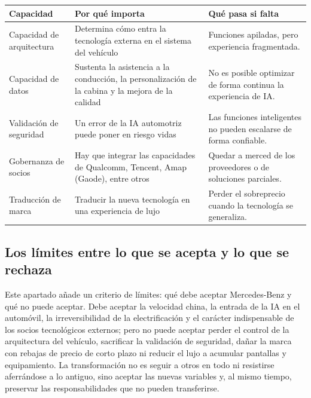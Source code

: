 \documentclass[a4paper]{article}
\begin{document}
\noindent\begin{tabularx}{\textwidth}{p{}p{}X}
\toprule
Capacidad & Por qué importa & Qué pasa si falta \\
\midrule
Capacidad de arquitectura & Determina cómo entra la tecnología externa en el sistema del vehículo & Funciones apiladas, pero experiencia fragmentada. \\
Capacidad de datos & Sustenta la asistencia a la conducción, la personalización de la cabina y la mejora de la calidad & No es posible optimizar de forma continua la experiencia de IA. \\
Validación de seguridad & Un error de la IA automotriz puede poner en riesgo vidas & Las funciones inteligentes no pueden escalarse de forma confiable. \\
Gobernanza de socios & Hay que integrar las capacidades de Qualcomm, Tencent, Amap (Gaode), entre otros & Quedar a merced de los proveedores o de soluciones parciales. \\
Traducción de marca & Traducir la nueva tecnología en una experiencia de lujo & Perder el sobreprecio cuando la tecnología se generaliza. \\
\bottomrule
\end{tabularx}

\subsection{Los límites entre lo que se acepta y lo que se rechaza}

Este apartado añade un criterio de límites: qué debe aceptar Mercedes-Benz y qué no puede aceptar. Debe aceptar la velocidad china, la entrada de la IA en el automóvil, la irreversibilidad de la electrificación y el carácter indispensable de los socios tecnológicos externos; pero no puede aceptar perder el control de la arquitectura del vehículo, sacrificar la validación de seguridad, dañar la marca con rebajas de precio de corto plazo ni reducir el lujo a acumular pantallas y equipamiento. La transformación no es seguir a otros en todo ni resistirse aferrándose a lo antiguo, sino aceptar las nuevas variables y, al mismo tiempo, preservar las responsabilidades que no pueden transferirse.
\end{document}
